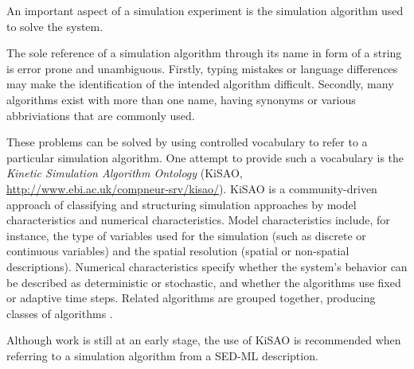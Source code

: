 \label{sec:kisao}

An important aspect of a simulation experiment is the simulation algorithm used to solve the system.

The sole reference of a simulation algorithm through its name in form of a string is error prone and unambiguous. Firstly, typing mistakes or language differences may make the identification of the intended algorithm difficult. Secondly, many algorithms exist with more than one name, having synonyms or various abbriviations that are commonly used.

These problems can be solved by using controlled vocabulary to refer to a particular simulation algorithm. One attempt to provide such a vocabulary is the \emph{Kinetic Simulation Algorithm Ontology} (KiSAO, \url{http://www.ebi.ac.uk/compneur-srv/kisao/}). KiSAO is a community-driven approach of classifying and structuring simulation approaches by model characteristics and numerical characteristics.  Model characteristics include, for instance, the type of variables used for the simulation (such as discrete or continuous variables) and the spatial resolution (spatial or non-spatial descriptions). Numerical characteristics specify whether the system's behavior can be described as deterministic or stochastic, and whether the algorithms use fixed or adaptive time steps.  
Related algorithms are grouped together, producing classes of algorithms \citep{CWK+10}.

Although work is still at an early stage, the use of KiSAO is recommended when referring to a simulation algorithm from a SED-ML description.


